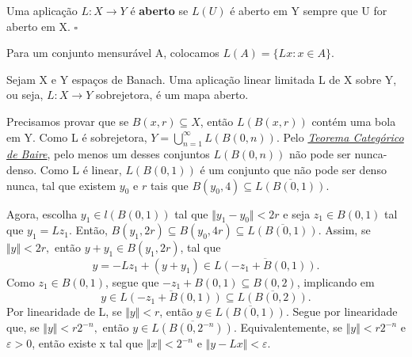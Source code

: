 \documentclass[MeasureTheory/measure_theory.tex]{subfiles}
\begin{document}
\begin{def*}
	Uma aplicação \(L:X\rightarrow Y\) é \textbf{aberto} se \(L(U)\) é aberto em Y sempre que U for aberto em X. \(\square\)
\end{def*}
Para um conjunto mensurável A, colocamos \(L(A) = \{Lx: x \in A\}\).
\hypertarget{open_mapping}{
	\begin{theorem*}
		Sejam X e Y espaços de Banach. Uma aplicação linear limitada L de X sobre Y, ou seja, \(L:X\rightarrow Y\) sobrejetora, é um mapa aberto.
	\end{theorem*}
}
\begin{proof*}
	Precisamos provar que se \(B(x, r)\subseteq X\), então \(L(B(x, r))\) contém uma bola em Y. Como L é sobrejetora, \(Y = \bigcup_{n=1}^{\infty}L(B(0, n))\). Pelo \hyperlink{baire_category}{\textit{Teorema Categórico de Baire}},
	pelo menos um desses conjuntos \(L(B(0, n))\) não pode ser nunca-denso. Como L é linear, \(L(B(0, 1))\) é um conjunto que não pode ser denso nunca, tal que existem \(y_{0}\) e \(r\) tais que \(B(y_{0}, 4)\subseteq \overline{L(B(0, 1))}\).

	Agora, escolha \(y_1\in l(B(0, 1))\) tal que \(\Vert y_1 - y_{0} \Vert < 2r\) e seja \(z_1\in B(0, 1)\) tal que \(y_1 = Lz_1.\) Então, \(B(y_1, 2r)\subseteq B(y_{0}, 4r)\subseteq \overline{L(B(0, 1))}.\) Assim, se \(\Vert y \Vert < 2r,\) então
	\(y + y_1\in B(y_1, 2r)\), tal que
	\[
		y= -Lz_1 + (y + y_1)\in \overline{L(-z_1 + B(0, 1))}.
	\]
	Como \(z_1\in B(0, 1)\), segue que \(-z_1 + B(0, 1)\subseteq B(0, 2)\), implicando em
	\[
		y\in \overline{L(-z_1 + B(0, 1))}\subseteq \overline{L(B(0, 2))}.
	\]
	Por linearidade de L, se \(\Vert y \Vert < r\), então \(y\in \overline{L(B(0, 1))}.\) Segue por linearidade que, se \(\Vert y \Vert < r2^{-n},\) então \(y\in \overline{L(B(0, 2^{-n}))}.\) Equivalentemente,
	se \(\Vert y \Vert < r2^{-n}\) e \(\varepsilon  > 0\), então existe x tal que \(\Vert x \Vert < 2^{-n} \) e \(\Vert y - Lx \Vert < \varepsilon .\)


\end{proof*}
\end{document}
